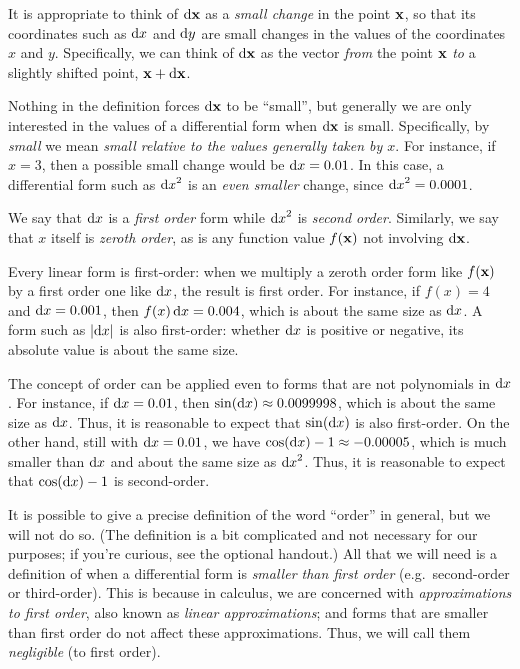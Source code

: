 It is appropriate to think of ${\mathrm{d} \mathbf{x}}$ as a \emph{small change} in the point $\mathbf{x}$, so that its coordinates such as ${\mathrm{d} x}$ and ${\mathrm{d} y}$ are small changes in the values of the coordinates $x$ and $y$.
Specifically, we can think of ${\mathrm{d} \mathbf{x}}$ as the vector \emph{from} the point $\mathbf{x}$ \emph{to} a slightly shifted point, $\mathbf{x}+{\mathrm{d} \mathbf{x}}$.
\begin{center}
\end{center}
Nothing in the definition forces ${\mathrm{d} \mathbf{x}}$ to be ``small'', but generally we are only interested in the values of a differential form when ${\mathrm{d} \mathbf{x}}$ is small.
Specifically, by \emph{small} we mean \emph{small relative to the values generally taken by $x$}.
For instance, if $x=3$, then a possible small change would be ${\mathrm{d} x} = 0.01$.
In this case, a differential form such as ${\mathrm{d} x}^2$ is an \emph{even smaller} change, since ${\mathrm{d} x}^2 = 0.0001$.

We say that ${\mathrm{d} x}$ is a \emph{first order} form while ${\mathrm{d} x}^2$ is \emph{second order}.
Similarly, we say that $x$ itself is \emph{zeroth order}, as is any function value $f(\mathbf{x})$ not involving ${\mathrm{d} \mathbf{x}}$.

Every linear form is first-order: when we multiply a zeroth order form like $f(\mathbf{x})$ by a first order one like ${\mathrm{d} x}$, the result is first order.
For instance, if $f(x) = 4$ and ${\mathrm{d} x} = 0.001$, then $f(x)\,{\mathrm{d} x} = 0.004$, which is about the same size as ${\mathrm{d} x}$.
A form such as $|{\mathrm{d} x}|$ is also first-order: whether ${\mathrm{d} x}$ is positive or negative, its absolute value is about the same size.

The concept of order can be applied even to forms that are not polynomials in ${\mathrm{d} x}$.
For instance, if ${\mathrm{d} x}=0.01$, then $\sin({\mathrm{d} x}) \approx 0.0099998$, which is about the same size as ${\mathrm{d} x}$.
Thus, it is reasonable to expect that $\sin({\mathrm{d} x})$ is also first-order.
On the other hand, still with ${\mathrm{d} x}=0.01$, we have $\cos({\mathrm{d} x}) - 1 \approx -0.00005$, which is much smaller than ${\mathrm{d} x}$ and about the same size as ${\mathrm{d} x}^2$.
Thus, it is reasonable to expect that $\cos({\mathrm{d} x}) - 1$ is second-order.

It is possible to give a precise definition of the word ``order'' in general, but we will not do so.
(The definition is a bit complicated and not necessary for our purposes; if you're curious, see the optional handout.)
All that we will need is a definition of when a differential form is \emph{smaller than first order} (e.g.\ second-order or third-order).
This is because in calculus, we are concerned with \emph{approximations to first order}, also known as \emph{linear approximations}; and forms that are smaller than first order do not affect these approximations.
Thus, we will call them \emph{negligible} (to first order).


